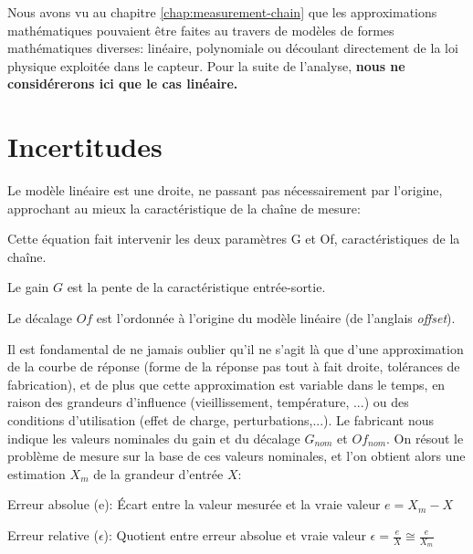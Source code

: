 \documentclass[main.tex]{subfiles}
\begin{document}
Nous avons vu au chapitre \ref{chap:measurement-chain} que les approximations mathématiques pouvaient être faites au travers de modèles de formes mathématiques diverses: linéaire, polynomiale ou découlant directement de la loi physique exploitée dans le capteur. Pour la suite de l'analyse, \textbf{nous ne considérerons ici que le cas linéaire.}

\section{Incertitudes}

Le modèle linéaire est une droite, ne passant pas nécessairement par l'origine, approchant au mieux la caractéristique de la chaîne de mesure:

\begin{center}
\end{center}

Cette équation fait intervenir les deux paramètres G et Of, caractéristiques de la chaîne.

\begin{definition}
    Le gain $G$ est la pente de la caractéristique entrée-sortie.
\end{definition}

\begin{definition}
    Le décalage $Of$ est l'ordonnée à l'origine du modèle linéaire (de l'anglais \emph{offset}).
\end{definition}

Il est fondamental de ne jamais oublier qu'il ne s'agit là que d'une approximation de la courbe de réponse (forme de la réponse pas tout à fait droite, tolérances de fabrication), et de plus que cette approximation est variable dans le temps, en raison des grandeurs d'influence (vieillissement, température, ...) ou des conditions d'utilisation (effet de charge, perturbations,...). Le fabricant nous indique les valeurs nominales du gain et du décalage $G_{nom}$ et $Of_{nom}$.
On résout le problème de mesure sur la base de ces valeurs nominales, et l'on obtient alors une estimation $X_{m}$ de la grandeur d'entrée $X$:

\begin{definition}
    Erreur absolue (e): Écart entre la valeur mesurée et la vraie valeur 	$e = X_{m} - X$
\end{definition}
\begin{definition}
    Erreur relative ($\epsilon$): Quotient entre erreur absolue et vraie valeur  $\epsilon = \frac{e}{X}  \cong \frac{e}{X_{m}}$
\end{definition}
\end{document}
